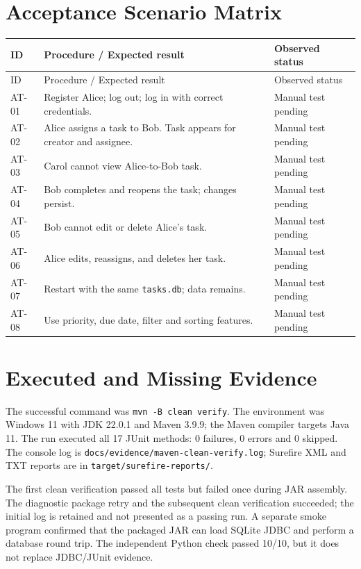 \documentclass[11pt,a4paper]{article}
\begin{document}
\section{Acceptance Scenario Matrix}
\small
\begin{longtable}{p{16mm}p{96mm}p{30mm}}
\toprule ID & Procedure / Expected result & Observed status \\ \midrule\endfirsthead
\toprule ID & Procedure / Expected result & Observed status \\ \midrule\endhead
AT-01 & Register Alice; log out; log in with correct credentials. & Manual test pending\\
AT-02 & Alice assigns a task to Bob. Task appears for creator and assignee. & Manual test pending\\
AT-03 & Carol cannot view Alice-to-Bob task. & Manual test pending\\
AT-04 & Bob completes and reopens the task; changes persist. & Manual test pending\\
AT-05 & Bob cannot edit or delete Alice's task. & Manual test pending\\
AT-06 & Alice edits, reassigns, and deletes her task. & Manual test pending\\
AT-07 & Restart with the same \texttt{tasks.db}; data remains. & Manual test pending\\
AT-08 & Use priority, due date, filter and sorting features. & Manual test pending\\
\bottomrule
\end{longtable}
\normalsize

\section{Executed and Missing Evidence}
The successful command was \texttt{mvn -B clean verify}. The environment was Windows 11 with JDK 22.0.1 and Maven 3.9.9; the Maven compiler targets Java 11. The run executed all 17 JUnit methods: 0 failures, 0 errors and 0 skipped. The console log is \texttt{docs/evidence/maven-clean-verify.log}; Surefire XML and TXT reports are in \texttt{target/surefire-reports/}.

The first clean verification passed all tests but failed once during JAR assembly. The diagnostic package retry and the subsequent clean verification succeeded; the initial log is retained and not presented as a passing run. A separate smoke program confirmed that the packaged JAR can load SQLite JDBC and perform a database round trip. The independent Python check passed 10/10, but it does not replace JDBC/JUnit evidence.
\end{document}
